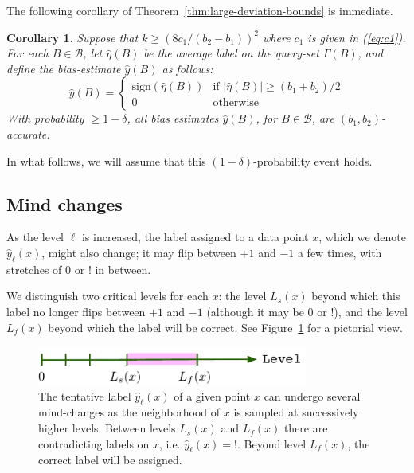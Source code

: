 \documentclass{article}
\def\B{{\mathcal B}}
\def\yh{{\widehat{y}}}
\newtheorem{cor}[thm]{Corollary}
\newcommand{\yoav}[1]{{\color{blue} {\bf Yoav:} #1}}
\begin{document}
The following corollary of Theorem~\ref{thm:large-deviation-bounds} is immediate.
\begin{cor}
Suppose that $k \geq (8c_1/(b_2-b_1))^2$ where $c_1$ is given in (\ref{eq:c1}). 
For each $B \in \B$, let $\widehat{\eta}(B)$ be the average label on the query-set $\Gamma(B)$, and define the bias-estimate $\yh(B)$ as follows:
$$ \yh(B)
= 
\left\{
\begin{array}{ll}
\mbox{sign}(\widehat{\eta}(B)) & \mbox{if $|\widehat{\eta}(B)| \geq (b_1 + b_2)/2$} \\
0 & \mbox{otherwise}
\end{array}
\right.
$$
With probability $\geq 1-\delta$, all bias estimates $\yh(B)$, for $B \in \B$, are $(b_1,b_2)$-accurate.
\label{cor:accurate-bias-estimates}
\end{cor}
In what follows, we will assume that this $(1-\delta)$-probability event holds.


\subsection{Mind changes}

As the level $\ell$ is increased, the label assigned to a data point $x$, which we denote $\yh_{\ell}(x)$, might also change; it may flip between $+1$ and $-1$ a few times, with stretches of $0$ or $!$ in between.


We distinguish two critical levels for each $x$: the level $L_s(x)$ beyond which this label no longer flips between $+1$ and $-1$ (although it may be $0$ or $!$), and the level $L_f(x)$ beyond which the label will be correct. See Figure~\ref{fig:two-levels} for a pictorial view.

\begin{figure}
\begin{center}
\includegraphics[width=3.5in]{home-stretch.pdf}
\end{center}
\caption{The tentative label $\yh_\ell(x)$ of a given point $x$ can undergo several mind-changes as the neighborhood of $x$ is sampled at successively higher levels. Between levels $L_s(x)$ and $L_f(x)$ there are contradicting labels on $x$, i.e.  $\yh_\ell(x)=!$. Beyond level $L_f(x)$, the correct label will be assigned.}
\label{fig:two-levels}
\end{figure}
\end{document}
